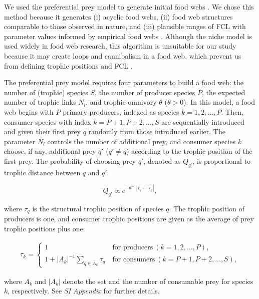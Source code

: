\documentclass[11pt, class=article, crop=false]{standalone}
\begin{document}
We used the preferential prey model to generate initial food webs \citep{johnson_trophic_2014}.
We chose this method because it generates (i) acyclic food webs, (ii) food web structures comparable to those observed in nature, and (iii) plausible ranges of FCL with parameter values informed by empirical food webs \citep{shibasaki_food_2024}.
Although the niche model \citep{williams_simple_2000} is used widely in food web research, this algorithm is unsuitable for our study because it may create loops and cannibalism in a food web, which prevent us from defining trophic positions and FCL \citep{shibasaki_food_2024}.

The preferential prey model requires four parameters to build a food web: the number of (trophic) species $S$, the number of producer species $P$, the expected number of trophic links $N_l$, and trophic omnivory $\theta$ ($\theta > 0$).
In this model, a food web begins with $P$ primary producers, indexed as species $k = 1, 2, ..., P$.
Then, consumer species with index $k = P + 1, P + 2, ..., S$ are sequentially introduced and given their first prey $q$ randomly from those introduced earlier.
The parameter $N_l$ controls the number of additional prey, and consumer species $k$ choose, if any, additional prey $q'$ ($q' \ne q$) according to the trophic position of the first prey.
The probability of choosing prey $q'$, denoted as $Q_{q'}$, is proportional to trophic distance between $q$ and $q'$:

\begin{equation}
    Q_{q'} \propto e^{-\theta^{-1} |\tau_{q'} - \tau_q|},
\end{equation}

where $\tau_q$ is the structural trophic position of species $q$.
The trophic position of producers is one, and
consumer trophic positions are given as the average of prey trophic positions plus one:

\begin{align}
    \tau_k = 
    \begin{cases}
    1 & ~\text{for producers}~ (k=1, 2, \ldots, P),\\
    1 + |A_{k}|^{-1} \sum_{q \in A_{k}} \tau_q & ~\text{for consumers}~ (k = P+1, P+2, \ldots, S),
    \end{cases}
\end{align}

where $A_{k}$ and $|A_{k}|$ denote the set and the number of consumable prey for species $k$, respectively.
See \textit{SI Appendix} for further details.
\end{document}
